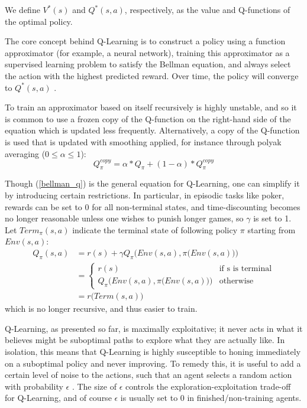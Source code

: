 We define $V^*(s)$ and $Q^*(s, a)$, respectively, as the value and Q-functions of the optimal policy.

The core concept behind Q-Learning is to construct a policy using a function approximator (for example, a neural network), training this approximator as a supervised learning problem to satisfy the Bellman equation, and always select the action with the highest predicted reward.
Over time, the policy will converge to $Q^*(s, a)$ \cite{Qlearn_convergence}.

To train an approximator based on itself recursively is highly unstable, and so it is common to use a frozen copy of the Q-function on the right-hand side of the equation which is updated less frequently. Alternatively, a copy of the Q-function is used that is updated with smoothing applied, for instance through polyak averaging ($0 \leq \alpha \leq 1$):
\begin{equation}
    Q_{\pi}^{copy} = \alpha * Q_{\pi} + (1 - \alpha) * Q_{\pi}^{copy}
\end{equation}

Though (\ref{bellman_q}) is the general equation for Q-Learning, one can simplify it by introducing certain restrictions. In particular, in episodic tasks like poker, rewards can be set to 0 for all non-terminal states, and time-discounting becomes no longer reasonable unless one wishes to punish longer games, so $\gamma$ is set to 1. Let $Term_{\pi}(s, a)$ indicate the terminal state of following policy $\pi$ starting from $Env(s, a)$:
\begin{equation}
\label{Qlearn_nobellman}
\begin{split}
Q_{\pi}(s, a) &= r(s) + \gamma Q_{\pi}\Big(Env(s, a), \pi\big(Env(s, a)\big)\Big)\\
&= \begin{cases}
r(s) &\mbox{if s is terminal} \\
Q_{\pi}\Big(Env(s, a), \pi\big(Env(s, a)\big)\Big) &\mbox{otherwise}
\end{cases}\\
&= r\big(Term(s, a)\big)
\end{split}
\end{equation}
which is no longer recursive, and thus easier to train.

Q-Learning, as presented so far, is maximally exploitative; it never acts in what it believes might be suboptimal paths to explore what they are actually like. In isolation, this means that Q-Learning is highly susceptible to honing immediately on a suboptimal policy and never improving. To remedy this, it is useful to add a certain level of noise to the actions, such that an agent selects a random action with probability $\epsilon$ \cite[Chapters 2.2 \& 2.3]{Sutton}. The size of $\epsilon$ controls the exploration-exploitation trade-off for Q-Learning, and of course $\epsilon$ is usually set to 0 in finished/non-training agents.

